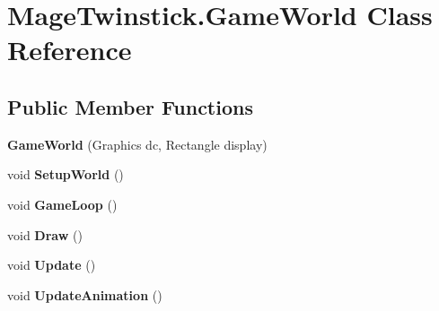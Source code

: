 \hypertarget{class_mage_twinstick_1_1_game_world}{}\section{Mage\+Twinstick.\+Game\+World Class Reference}
\label{class_mage_twinstick_1_1_game_world}
\subsection*{Public Member Functions}
\begin{DoxyCompactItemize}
\item 
\hypertarget{class_mage_twinstick_1_1_game_world_a270f04b1de26513f7893e361303fb129}{}{\bfseries Game\+World} (Graphics dc, Rectangle display)\label{class_mage_twinstick_1_1_game_world_a270f04b1de26513f7893e361303fb129}

\item 
\hypertarget{class_mage_twinstick_1_1_game_world_adb5bdbb96b081dfc7e2ed7a9b2acfa10}{}void {\bfseries Setup\+World} ()\label{class_mage_twinstick_1_1_game_world_adb5bdbb96b081dfc7e2ed7a9b2acfa10}

\item 
\hypertarget{class_mage_twinstick_1_1_game_world_a7a03f6b9f40b1e3e9aed96a614caf5e3}{}void {\bfseries Game\+Loop} ()\label{class_mage_twinstick_1_1_game_world_a7a03f6b9f40b1e3e9aed96a614caf5e3}

\item 
\hypertarget{class_mage_twinstick_1_1_game_world_aad92b4d3c95491f04ac4885d96c15c3c}{}void {\bfseries Draw} ()\label{class_mage_twinstick_1_1_game_world_aad92b4d3c95491f04ac4885d96c15c3c}

\item 
\hypertarget{class_mage_twinstick_1_1_game_world_a3912f8f9ec0acd789eb46e1abcfcf2de}{}void {\bfseries Update} ()\label{class_mage_twinstick_1_1_game_world_a3912f8f9ec0acd789eb46e1abcfcf2de}

\item 
\hypertarget{class_mage_twinstick_1_1_game_world_a6b30c5cbcee01e32068f0d2f117f96fb}{}void {\bfseries Update\+Animation} ()\label{class_mage_twinstick_1_1_game_world_a6b30c5cbcee01e32068f0d2f117f96fb}

\end{DoxyCompactItemize}
